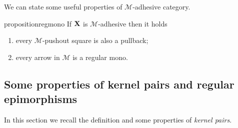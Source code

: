 \documentclass[a4paper,UKenglish,cleveref,pdftex,thm-restate,numberwithinsect]{lipics-v2021}
\def\C{\textbf {\textup{C}}}
\def\X{\textbf {\textup{X}}}
\begin{document}
\iffalse 
\begin{remark}\label{rem:deco}
We can point out an important property of strict $\mathcal{M}$-adhesive categories with pullbacks.  Consider the solid part of the cube aside, whose bottom case is an $\mathcal{M}$-pushout.
	
	\parbox{9.5cm}{	Given an arrow $d\colon X\to D$, we can present the object $X$ has a pushout: indeed, consider the following cube, in which all the three vertical squares are pullbacks.}
	\parbox{3cm}{
	\xymatrix@C=15pt@R=9pt{&V\ar[dd]|\hole_(.65){a}\ar[rr]^{v} \ar@{>.>}[dl]_{u} && Y \ar[dd]^{b} \ar@{>->}[dl]_{y} \\ Z  \ar[dd]_{c}\ar[rr]^(.7){z} & & X \ar[dd]_(.3){d}\\&A\ar[rr]|\hole^(.65){f} \ar@{>->}[dl]^{m} && B \ar@{>->}[dl]^{n} \\C \ar[rr]_{g} & & D }}

Now, notice that, since the front square is a pullback, then the dotted arrow $u\colon V\to Z$ exists. Moreover, the usual composition and decomposition property of pullbacks \cite{mac2013categories} entails that the left face of the cube so obtained is a pullback too, proving that $u$ is in $\mathcal{M}$ and that the top square is a pushout.

	Clearly if the arrow $p\colon X\to D$ is in $\mathcal{M}$, we can omit the assumptions of strictness and the existence of all pullbacks.
\end{remark}
\fi 


We can state some useful properties of $\mathcal{M}$-adhesive category.

\begin{restatable}{proposition}{regmono}\label{prop:regmono}
	If $\X$ is $\mathcal{M}$-adhesive then it holds
	\begin{enumerate}
		\item every $\mathcal{M}$-pushout square is also a pullback;
		\item every arrow in $\mathcal{M}$ is a regular mono.
	\end{enumerate}
\end{restatable}


\subsection{Some properties of kernel pairs and regular epimorphisms}

In this section we recall the definition and some properties of \emph{kernel pairs}.
\end{document}
